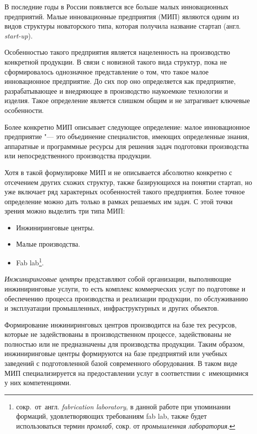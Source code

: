 В последние годы в России появляется все больше малых инновационных предприятий. Малые инновационные предприятия (МИП) являются одним из видов структуры новаторского типа, которая получила название стартап (англ. \textit{start-up}).

Особенностью такого предприятия является нацеленность на производство конкретной продукции. В связи с новизной такого вида структур, пока не сформировалось однозначное представление о том, что такое малое инновационное предприятие. До сих пор оно определяется как предприятие, разрабатывающее и внедряющее в производство наукоемкие технологии и изделия. Такое определение является слишком общим и не затрагивает ключевые особенности.

Более конкретно МИП описывает следующее определение: малое инновационное предприятие "--- это объединение специалистов, имеющих определенные знания, аппаратные и программные ресурсы для решения задач подготовки производства или непосредственного производства продукции.

Хотя в такой формулировке МИП и не описывается абсолютно конкретно с отсечением других схожих структур, также базирующихся на понятии стартап, но уже включает ряд характерных особенностей такого предприятия. Более точное определение можно дать только в рамках решаемых им задач. С этой точки зрения можно выделить три типа МИП:

\begin{itemize}
	\item Инжиниринговые центры.
	\item Малые производства.
	\item Fab lab\footnote{сокр.~от~англ. \textit{fabrication laboratory}, в данной работе при упоминании формаций, удовлетворяющих требованиям fab lab, также будет использоваться термин \textit{промлаб}, сокр. от \textit{промышленная лаборатория}.}.
\end{itemize}

\textit{Инжиниринговые центры} представляют собой организации, выполняющие инжиниринговые услуги, то есть комплекс коммерческих услуг по подготовке и обеспечению процесса производства и реализации продукции, по обслуживанию и эксплуатации промышленных, инфраструктурных и других объектов.

Формирование инжиниринговых центров производится на базе тех ресурсов, которые не задействованы в производственном процессе, задействованы не полностью или не предназначены для производства продукции. Таким образом, инжиниринговые центры формируются на базе предприятий или учебных заведений с подготовленной базой современного оборудования. В таком виде МИП специализируется на предоставлении услуг в соответствии с~имеющимися у них компетенциями.

